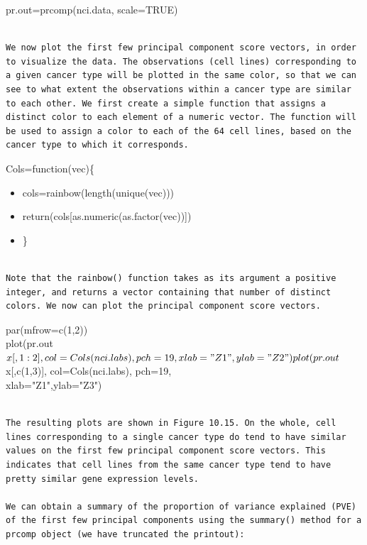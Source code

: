 \documentclass[10pt]{article}
\begin{document}
\begin{displayquote}
pr.out=prcomp(nci.data, scale=TRUE)
\end{displayquote}

\begin{verbatim}

We now plot the first few principal component score vectors, in order to visualize the data. The observations (cell lines) corresponding to a given cancer type will be plotted in the same color, so that we can see to what extent the observations within a cancer type are similar to each other. We first create a simple function that assigns a distinct color to each element of a numeric vector. The function will be used to assign a color to each of the 64 cell lines, based on the cancer type to which it corresponds.
\end{verbatim}

Cols=function(vec)\{

\begin{itemize}
  \item cols=rainbow(length(unique(vec)))
  \item return(cols[as.numeric(as.factor(vec))])
  \item \}
\end{itemize}

\begin{verbatim}

Note that the rainbow() function takes as its argument a positive integer, and returns a vector containing that number of distinct colors. We now can plot the principal component score vectors.
\end{verbatim}

\begin{displayquote}
par(mfrow=c(1,2))\\
plot(pr.out$x[,1:2], col=Cols(nci.labs), pch=19,
    xlab="Z1",ylab="Z2")
plot(pr.out$x[,c(1,3)], col=Cols(nci.labs), pch=19,\\
xlab="Z1",ylab="Z3")
\end{displayquote}

\begin{verbatim}

The resulting plots are shown in Figure 10.15. On the whole, cell lines corresponding to a single cancer type do tend to have similar values on the first few principal component score vectors. This indicates that cell lines from the same cancer type tend to have pretty similar gene expression levels.

We can obtain a summary of the proportion of variance explained (PVE) of the first few principal components using the summary() method for a prcomp object (we have truncated the printout):
\end{verbatim}
\end{document}
